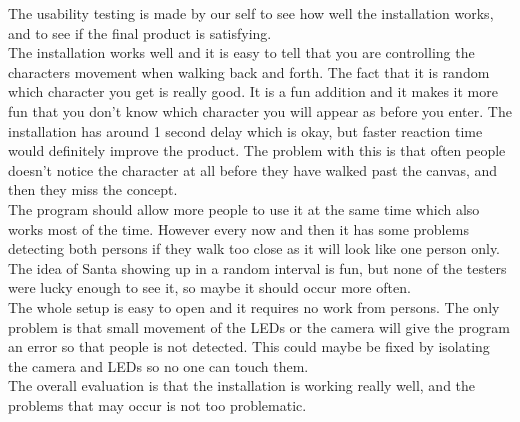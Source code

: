 The usability testing is made by our self to see how well the installation works, and to see if the final product is satisfying. \\
The installation works well and it is easy to tell that you are controlling the characters movement when walking back and forth. The fact that it is random which character you get is really good. It is a fun addition and it makes it more fun that you don't know which character you will appear as before you enter. The installation has around 1 second delay which is okay, but faster reaction time would definitely improve the product. The problem with this is that often people doesn't notice the character at all before they have walked past the canvas, and then they miss the concept. \\
The program should allow more people to use it at the same time which also works most of the time. However every now and then it has some problems detecting both persons if they walk too close as it will look like one person only.
The idea of Santa showing up in a random interval is fun, but none of the testers were lucky enough to see it, so maybe it should occur more often.\\
The whole setup is easy to open and it requires no work from persons. The only problem is that small movement of the LEDs or the camera will give the program an error so that people is not detected. This could maybe be fixed by isolating the camera and LEDs so no one can touch them.\\
The overall evaluation is that the installation is working really well, and the problems that may occur is not too problematic. 

